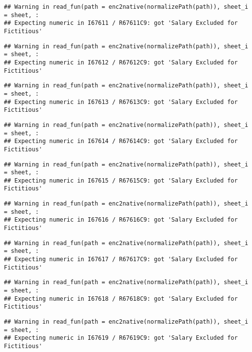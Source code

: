 \documentclass[
]{article}
\begin{document}
\begin{verbatim}
## Warning in read_fun(path = enc2native(normalizePath(path)), sheet_i = sheet, :
## Expecting numeric in I67611 / R67611C9: got 'Salary Excluded for Fictitious'
\end{verbatim}

\begin{verbatim}
## Warning in read_fun(path = enc2native(normalizePath(path)), sheet_i = sheet, :
## Expecting numeric in I67612 / R67612C9: got 'Salary Excluded for Fictitious'
\end{verbatim}

\begin{verbatim}
## Warning in read_fun(path = enc2native(normalizePath(path)), sheet_i = sheet, :
## Expecting numeric in I67613 / R67613C9: got 'Salary Excluded for Fictitious'
\end{verbatim}

\begin{verbatim}
## Warning in read_fun(path = enc2native(normalizePath(path)), sheet_i = sheet, :
## Expecting numeric in I67614 / R67614C9: got 'Salary Excluded for Fictitious'
\end{verbatim}

\begin{verbatim}
## Warning in read_fun(path = enc2native(normalizePath(path)), sheet_i = sheet, :
## Expecting numeric in I67615 / R67615C9: got 'Salary Excluded for Fictitious'
\end{verbatim}

\begin{verbatim}
## Warning in read_fun(path = enc2native(normalizePath(path)), sheet_i = sheet, :
## Expecting numeric in I67616 / R67616C9: got 'Salary Excluded for Fictitious'
\end{verbatim}

\begin{verbatim}
## Warning in read_fun(path = enc2native(normalizePath(path)), sheet_i = sheet, :
## Expecting numeric in I67617 / R67617C9: got 'Salary Excluded for Fictitious'
\end{verbatim}

\begin{verbatim}
## Warning in read_fun(path = enc2native(normalizePath(path)), sheet_i = sheet, :
## Expecting numeric in I67618 / R67618C9: got 'Salary Excluded for Fictitious'
\end{verbatim}

\begin{verbatim}
## Warning in read_fun(path = enc2native(normalizePath(path)), sheet_i = sheet, :
## Expecting numeric in I67619 / R67619C9: got 'Salary Excluded for Fictitious'
\end{verbatim}
\end{document}
